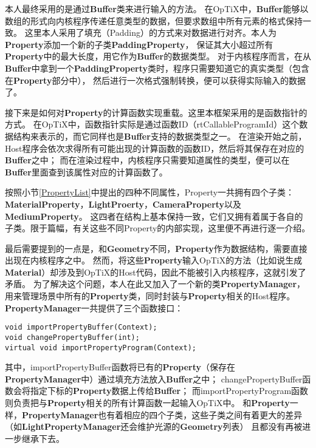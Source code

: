 本人最终采用的是通过\textbf{Buffer}类来进行输入的方法。
在OpTiX中，\textbf{Buffer}能够以数组的形式向内核程序传递任意类型的数据，但要求数组中所有元素的格式保持一致。
这里本人采用了填充（Padding）的方式来对数据进行对齐。本人为\textbf{Property}添加一个新的子类\textbf{PaddingProperty}，
保证其大小超过所有\textbf{Property}中的最大长度，用它作为\textbf{Buffer}的数据类型。
对于内核程序而言，在从\textbf{Buffer}中拿到一个\textbf{PaddingProperty}类时，程序只需要知道它的真实类型（包含在\textbf{Property}部分中），
然后进行一次格式强制转换，便可以获得实际输入的数据了。


接下来是如何对\textbf{Property}的计算函数实现重载。这里本框架采用的是函数指针的方式。
在OpTiX中，函数指针实际是通过函数ID（rtCallableProgramId）这个数据结构来表示的，而它同样也是\textbf{Buffer}支持的数据类型之一。
在渲染开始之前，Host程序会依次求得所有可能出现的计算函数的函数ID，然后将其保存在对应的\textbf{Buffer}之中；
而在渲染过程中，内核程序只需要知道属性的类型，便可以在\textbf{Buffer}里面查到该属性对应的计算函数了。

按照小节\ref{PropertyList}中提出的四种不同属性，Property一共拥有四个子类：\textbf{\textbf{Material}Property}，\textbf{LightProerty}，\textbf{CameraProperty}以及\textbf{MediumProperty}。
这四者在结构上基本保持一致，它们又拥有着属于各自的子类。限于篇幅，有关这些不同Property的内部实现，这里便不再进行逐一介绍。

最后需要提到的一点是，和\textbf{Geometry}不同，\textbf{Property}作为数据结构，需要直接出现在内核程序之中。
然而，将这些\textbf{Property}输入OpTiX的方法（比如说生成\textbf{Material}）却涉及到OpTiX的Host代码，因此不能被引入内核程序，这就引发了矛盾。
为了解决这个问题，本人在此又加入了一个新的类\textbf{PropertyManager}，
用来管理场景中所有的\textbf{Property}类，同时封装与\textbf{Property}相关的Host程序。\textbf{PropertyManager}一共提供了三个函数接口：

\lstset{language=C++}
\begin{lstlisting}
void importPropertyBuffer(Context);
void changePropertyBuffer(int);
virtual void importPropertyProgram(Context);
\end{lstlisting}

其中，importPropertyBuffer函数将已有的\textbf{Property}（保存在\textbf{PropertyManager}中）通过填充方法放入\textbf{Buffer}之中；
changePropertyBuffer函数会将指定下标的\textbf{Property}数据上传给\textbf{Buffer}；
而importPropertyProgram函数则负责把与\textbf{Property}相关的所有计算函数一起输入OpTiX中。
和\textbf{Property}一样，\textbf{PropertyManager}也有着相应的四个子类，这些子类之间有着更大的差异（如\textbf{LightPropertyManager}还会维护光源的\textbf{Geometry}列表）
且都没有再被进一步继承下去。

